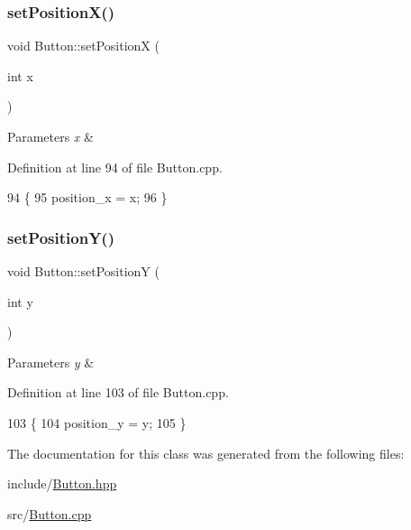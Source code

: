 \subsubsection{\texorpdfstring{set\+Position\+X()}{setPositionX()}}
{\footnotesize\ttfamily void Button\+::set\+PositionX (\begin{DoxyParamCaption}\item[{int}]{x }\end{DoxyParamCaption})}


\begin{DoxyParams}{Parameters}
{\em x} & \\
\hline
\end{DoxyParams}


Definition at line 94 of file Button.\+cpp.


\begin{DoxyCode}
94                                \{
95     position\_x = x;
96 \}
\end{DoxyCode}
\mbox{\label{class_button_a05e92fd7e167df2301247cc022d2694d}} 
\subsubsection{\texorpdfstring{set\+Position\+Y()}{setPositionY()}}
{\footnotesize\ttfamily void Button\+::set\+PositionY (\begin{DoxyParamCaption}\item[{int}]{y }\end{DoxyParamCaption})}


\begin{DoxyParams}{Parameters}
{\em y} & \\
\hline
\end{DoxyParams}


Definition at line 103 of file Button.\+cpp.


\begin{DoxyCode}
103                                \{
104     position\_y = y;
105 \}
\end{DoxyCode}


The documentation for this class was generated from the following files\+:\begin{DoxyCompactItemize}
\item 
include/\mbox{\hyperlink{_button_8hpp}{Button.\+hpp}}\item 
src/\mbox{\hyperlink{_button_8cpp}{Button.\+cpp}}\end{DoxyCompactItemize}
